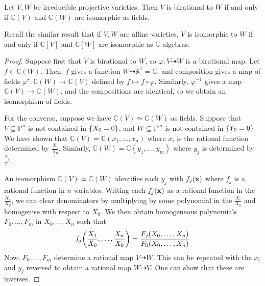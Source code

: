 \begin{theorem}
    Let \( V, W \) be irreducible projective varieties.
    Then \( V \) is birational to \( W \) if and only if \( \mathbb C(V) \) and \( \mathbb C(W) \) are isomorphic as fields.
\end{theorem}
Recall the similar result that if \( V, W \) are affine varieties, \( V \) is isomorphic to \( W \) if and only if \( \mathbb C[V] \) and \( \mathbb C[W] \) are isomorphic as \( \mathbb C \)-algebras.
\begin{proof}
    Suppose first that \( V \) is birational to \( W \), so \( \varphi \colon V \dashrightarrow W \) is a birational map.
    Let \( f \in \mathbb C(W) \).
    Then, \( f \) gives a function \( W \dashrightarrow \mathbb A^1 = \mathbb C \), and composition gives a map of fields \( \varphi^\star \colon \mathbb C(W) \to \mathbb C(V) \) defined by \( f \mapsto f \circ \varphi \).
    Similarly, \( \varphi^{-1} \) gives a map \( \mathbb C(V) \to \mathbb C(W) \), and the compositions are identical, so we obtain an isomorphism of fields.

    For the converse, suppose we have \( \mathbb C(V) \simeq \mathbb C(W) \) as fields.
    Suppose that \( V \subseteq \mathbb P^n \) is not contained in \( \qty{X_0 = 0} \), and \( W \subseteq \mathbb P^m \) is not contained in \( \qty{Y_0 = 0} \).
    We have shown that \( \mathbb C(V) = \mathbb C(x_1, \dots, x_n) \) where \( x_i \) is the rational function determined by \( \frac{X_i}{X_0} \).
    Simiarly, \( \mathbb C(W) = \mathbb C(y_1, \dots, y_m) \) where \( y_j \) is determined by \( \frac{Y_j}{Y_0} \).

    An isomorphism \( \mathbb C(V) \simeq \mathbb C(W) \) identifies each \( y_j \) with \( f_j(\vb x) \) where \( f_j \) is a rational function in \( n \) variables.
    Writing each \( f_j(\vb x) \) as a rational function in the \( \frac{X_i}{X_0} \), we can clear denominators by multiplying by some polynomial in the \( \frac{X_i}{X_0} \) and homogenise with respect to \( X_0 \).
    We then obtain homogeneous polynomials \( F_0, \dots, F_m \) in \( X_0, \dots, X_n \) such that
    \[ f_j\qty(\frac{X_1}{X_0}, \dots, \frac{X_n}{X_0}) = \frac{F_j(X_0, \dots, X_n)}{F_0(X_0, \dots, X_n)} \]
    Now, \( F_0, \dots, F_m \) determine a rational map \( V \dashrightarrow W \).
    This can be repeated with the \( x_i \) and \( y_j \) reversed to obtain a rational map \( W \dashrightarrow V \).
    One can show that these are inverses.
\end{proof}
